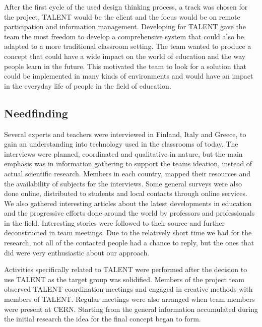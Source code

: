\documentclass[english,12pt,a4paper,dvips]{article}
\begin{document}
After the first cycle of the used design thinking process, a track was chosen for the project, TALENT would be the client and the focus would be on remote participation and information management. Developing for TALENT gave the team the most freedom to develop a comprehensive system that could also be adapted to a more traditional classroom setting. The team wanted to produce a concept that could have a wide impact on the world of education and the way people learn in the future. This motivated the team to look for a solution that could be implemented in many kinds of environments and would have an impact in the everyday life of people in the field of education.


\subsection{Needfinding}

Several experts and teachers were interviewed in Finland, Italy and Greece, to gain an understanding into technology used in the classrooms of today. The interviews were planned, coordinated and qualitative in nature, but the main emphasis was in information gathering to support the teams ideation, instead of actual scientific research. Members in each country, mapped their resources and the availability of subjects for the interviews. Some general surveys were also done online, distributed to students and local contacts through online services. We also gathered interesting articles about the latest developments in education and the progressive efforts done around the world by professors and professionals in the field. Interesting stories were followed to their source and further deconstructed in team meetings. Due to the relatively short time we had for the research, not all of the contacted people had a chance to reply, but the ones that did were very enthusiastic about our approach.

Activities specifically related to TALENT were performed after the decision to use TALENT as the target group was solidified. Members of the project team observed TALENT coordination meetings and engaged in creative methods with members of TALENT. Regular meetings were also arranged when team members were present at CERN. Starting from the general information accumulated during the initial research the idea for the final concept began to form.
\end{document}
